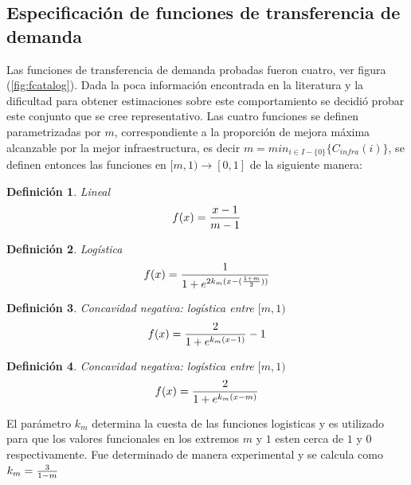 \documentclass{article}
\newtheorem{definition}{Definición}
\begin{document}
  \subsection*{Especificación de funciones de transferencia de demanda}

  Las funciones de transferencia de demanda probadas fueron cuatro, ver figura (\ref{fig:fcatalog}). Dada la poca información encontrada en la literatura y la dificultad para obtener estimaciones sobre este comportamiento se decidió probar este conjunto que se cree representativo. Las cuatro funciones se definen parametrizadas por $m$, correspondiente a la proporción de mejora máxima alcanzable por la mejor infraestructura, es decir $m = min_{i \in I - \{0\}} \{ C_{infra}(i) \}$, se definen entonces las funciones en $[m, 1) \rightarrow [0, 1]$ de la siguiente manera:

  \begin{definition}
    Lineal
    \begin{align}
        f(x) = {x -1 \over m - 1}
    \end{align}
  \end{definition}

  \begin{definition}
    Logística
    \begin{align}
        f(x) = {1 \over 1 + e^{2k_m(x - ({1 + m \over 2}))}}
    \end{align}
  \end{definition}

  \begin{definition}
    Concavidad negativa: logística entre $[m, 1)$
    \begin{align}
        f(x) = {2 \over 1 + e^{k_m(x - 1)}} - 1
    \end{align}
  \end{definition}

  \begin{definition}
    Concavidad negativa: logística entre $[m, 1)$
    \begin{align}
        f(x) = {2 \over 1 + e^{k_m(x - m)}}
    \end{align}
  \end{definition}

  El parámetro $k_m$ determina la cuesta de las funciones logisticas y es utilizado para que los valores funcionales en los extremos $m$ y $1$ esten cerca de $1$ y $0$ respectivamente. Fue determinado de manera experimental y se calcula como $k_m = {3 \over 1 - m}$
\end{document}
